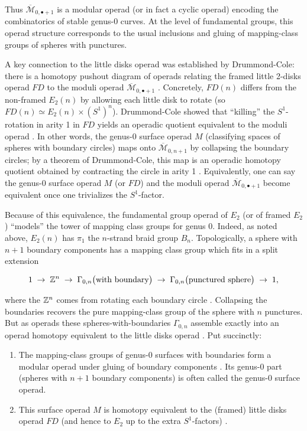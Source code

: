 Thus $\overline{\mathcal{M}}_{0,\bullet+1}$ is a modular operad (or in fact a cyclic operad) encoding the combinatorics of stable genus-0 curves.  At the level of fundamental groups, this operad structure corresponds to the usual inclusions and gluing of mapping-class groups of spheres with punctures.

A key connection to the little disks operad was established by Drummond-Cole: there is a homotopy pushout diagram of operads relating the framed little 2-disks operad $FD$ to the moduli operad $\overline{\mathcal{M}}_{0,\bullet+1}$ \cite{de_Brito_Horel_Robertson_2019}. Concretely, $FD(n)$ differs from the non-framed $E_2(n)$ by allowing each little disk to rotate (so $FD(n)\simeq E_2(n)\times (S^1)^n$).  Drummond-Cole showed that “killing” the $S^1$-rotation in arity 1 in $FD$ yields an operadic quotient equivalent to the moduli operad \cite{de_Brito_Horel_Robertson_2019}. In other words, the genus-0 surface operad $M$ (classifying spaces of spheres with boundary circles) maps onto ${\overline{\mathcal{M}}_{0,n+1}}$ by collapsing the boundary circles; by a theorem of Drummond-Cole, this map is an operadic homotopy quotient obtained by contracting the circle in arity 1 \cite{de_Brito_Horel_Robertson_2019}. Equivalently, one can say the genus-0 surface operad $M$ (or $FD$) and the moduli operad $\overline{\mathcal{M}}_{0,\bullet+1}$ become equivalent once one trivializes the $S^1$-factor.

Because of this equivalence, the fundamental group operad of $E_2$ (or of framed $E_2$) “models” the tower of mapping class groups for genus 0.  Indeed, as noted above, $E_2(n)$ has $\pi_1$ the $n$-strand braid group $B_n$.  Topologically, a sphere with $n+1$ boundary components has a mapping class group which fits in a split extension

$$
  1 \;\to\; \mathbb{Z}^n \;\to\; \Gamma_{0,n}\bigl(\text{with boundary}\bigr) \;\to\; \Gamma_{0,n}\bigl(\text{punctured sphere}\bigr)\;\to\;1,
$$

where the $\mathbb{Z}^n$ comes from rotating each boundary circle \cite{Borghi_Robertson_2025}. Collapsing the boundaries recovers the pure mapping-class group of the sphere with $n$ punctures.  But as operads these spheres-with-boundaries ${\Gamma_{0,n}}$ assemble exactly into an operad homotopy equivalent to the little disks operad \cite{Borghi_Robertson_2025}\cite{de_Brito_Horel_Robertson_2019}. Put succinctly:

\begin{enumerate}
    \item The mapping-class groups of genus-0 surfaces with boundaries form a modular operad under gluing of boundary components \cite{Borghi_Robertson_2025}. Its genus-0 part (spheres with $n+1$ boundary components) is often called the genus-0 surface operad.
    \item This surface operad $M$ is homotopy equivalent to the (framed) little disks operad $FD$ (and hence to $E_2$ up to the extra $S^1$-factors) \cite{de_Brito_Horel_Robertson_2019}.
\end{enumerate}


